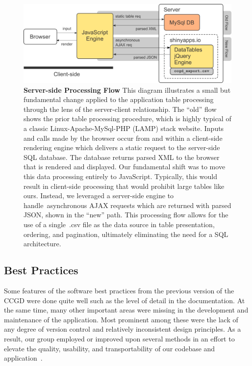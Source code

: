 \documentclass[10pt]{report}
\begin{document}
\begin{figure}[H]
    \centering
    \includegraphics[width=\textwidth]{fig/parse_flow.png}
    \caption[Server-side Processing Flow]{\textbf{Server-side Processing Flow} This diagram illustrates a small but fundamental change applied to the application table processing through the lens of the server-client relationship. The ``old'' flow shows the prior table processing procedure, which is highly typical of a classic Linux-Apache-MySql-PHP (LAMP) stack website. Inputs and calls made by the browser occur from and within a client-side rendering engine which delivers a static request to the server-side SQL database. The database returns parsed XML to the browser that is rendered and displayed. Our fundamental shift was to move this data processing entirely to JavaScript. Typically, this would result in client-side processing that would prohibit large tables like ours. Instead, we leveraged a server-side engine to handle asynchronous AJAX requests which are returned with parsed JSON, shown in the ``new'' path. This processing flow allows for the use of a single~.csv file as the data source in table presentation, ordering, and pagination, ultimately eliminating the need for a SQL architecture.}\label{fig:parseFlow}
\end{figure}

\subsection{Best Practices}
Some features of the software best practices from the previous version of the CCGD were done quite well such as the level of detail in the documentation. At the same time, many other important areas were missing in the development and maintenance of the application. Most prominent among these were the lack of any degree of version control and relatively inconsistent design principles. As a result, our group employed or improved upon several methods in an effort to elevate the quality, usability, and transportability of our codebase and application~\cite{Fincham2011}.
\end{document}
